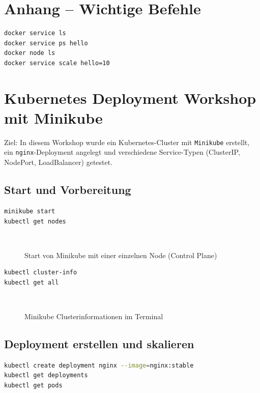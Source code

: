 \documentclass[11pt,a4paper,twocolumn]{article}
\newcommand{\placeholderfig}[2]{%
  \begin{figure}[H]\centering
    \fbox{\rule{0pt}{0.3\linewidth}\rule{0.9\linewidth}{0pt}}\\[2mm]
    \caption{#1}\label{fig:#2}
  \end{figure}}
\begin{document}
\section{Anhang – Wichtige Befehle}
\begin{lstlisting}[language=bash]
docker service ls
docker service ps hello
docker node ls
docker service scale hello=10
\end{lstlisting}

\section{Kubernetes Deployment Workshop mit Minikube}

Ziel: In diesem Workshop wurde ein Kubernetes-Cluster mit \texttt{Minikube} erstellt, ein \texttt{nginx}-Deployment angelegt und verschiedene Service-Typen (ClusterIP, NodePort, LoadBalancer) getestet.

\subsection{Start und Vorbereitung}

\begin{lstlisting}[language=bash,caption={Start von Minikube und Überprüfung der Umgebung}]
minikube start
kubectl get nodes
\end{lstlisting}

\placeholderfig{Start von Minikube mit einer einzelnen Node (Control Plane)}{minikube-start}

\begin{lstlisting}[language=bash,caption={Überprüfung des Cluster-Status}]
kubectl cluster-info
kubectl get all
\end{lstlisting}

\placeholderfig{Minikube Clusterinformationen im Terminal}{cluster-info}

\subsection{Deployment erstellen und skalieren}

\begin{lstlisting}[language=bash,caption={nginx Deployment mit einem Pod erstellen}]
kubectl create deployment nginx --image=nginx:stable
kubectl get deployments
kubectl get pods
\end{lstlisting}
\end{document}

